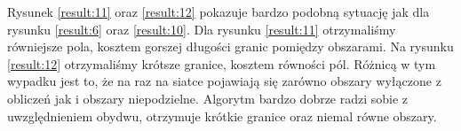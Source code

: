 Rysunek \ref{result:11} oraz \ref{result:12} pokazuje bardzo podobną sytuację jak dla rysunku \ref{result:6} oraz
\ref{result:10}.
Dla rysunku \ref{result:11} otrzymaliśmy równiejsze pola, kosztem gorszej długości granic pomiędzy obszarami.
Na rysunku \ref{result:12} otrzymaliśmy krótsze granice, kosztem równości pól.
Różnicą w tym wypadku jest to, że na raz na siatce pojawiają się zarówno obszary wyłączone z obliczeń jak i
obszary niepodzielne.
Algorytm bardzo dobrze radzi sobie z uwzględnieniem obydwu, otrzymuje krótkie granice oraz niemal równe obszary.
\begin{figure}[h]
\centering
\begin{subfigure}{.33\textwidth}
    \centering
    \caption[short]{}
\end{subfigure}%
\begin{subfigure}{.33\textwidth}
    \centering
    \caption[short]{}
\end{subfigure}%

\end{figure}
